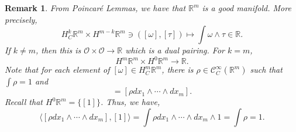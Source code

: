 \documentclass[10pt]{article}
\newtheorem{remark}{Remark}[section]
\newcommand{\R}[0]{\mathbb{R}}
\newcommand{\cinf}[0]{\mathcal{C}^\infty}
\begin{document}
\begin{remark}
  From Poincaré Lemmas, we have that $\R^m$ is a good manifold. More precisely,
  \begin{equation*}
    H^k_C\R^m\times H^{m-k}\R^m\ni([\omega],[\tau])\mapsto\int\omega\wedge\tau\in\R.
  \end{equation*}
  If $k\not=m$, then this is $\mathcal{O}\times\mathcal{O}\to\R$ which is a dual pairing. For $k=m$,
  \begin{equation*}
    H^m\R^m\times H^0\R^m\to\R.
  \end{equation*}
  Note that for each element of $[\omega]\in H^m_C\R^m$, there is $\rho\in\cinf_C(\R^m)$ such that $\int\rho=1$ and 
  \begin{equation*}
    [\omega]= [\rho dx_1\wedge\cdots\wedge dx_m].
  \end{equation*}
  Recall that $H^0\R^m = \{[1]\}$. Thus, we have,
  \begin{equation*}
    \langle[\rho dx_1\wedge\cdots\wedge dx_m],[1]\rangle = \int\rho dx_1\wedge\cdots\wedge dx_m\wedge 1 = \int\rho = 1.
  \end{equation*}
\end{remark}
\end{document}
